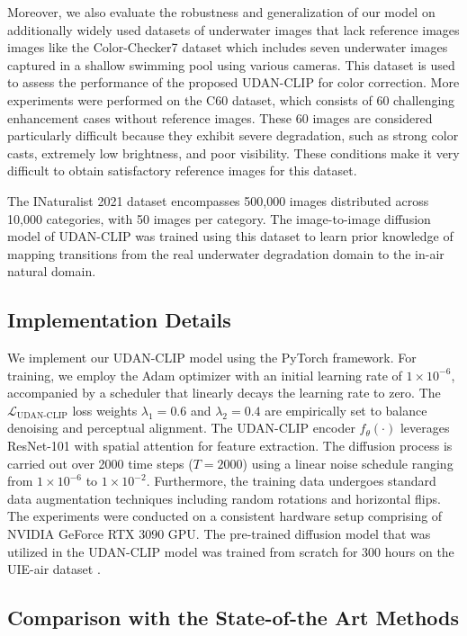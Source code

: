 \documentclass[3p,12pt,authoryear]{elsarticle}
\begin{document}
Moreover, we also evaluate the robustness and generalization of our model on additionally widely used datasets of underwater images that lack reference images images like the Color-Checker7 \cite{gsciede00note:crna03} dataset which includes seven underwater images captured in a shallow swimming pool using various cameras. This dataset is used to assess the performance of the proposed UDAN-CLIP for color correction. More experiments were performed on the C60 \cite{8917818} dataset, which consists of 60 challenging enhancement cases without reference images. These 60 images are considered particularly difficult because they exhibit severe degradation, such as strong color casts, extremely low brightness,  and poor visibility. These conditions make it very difficult to obtain satisfactory reference images for this dataset.

The INaturalist 2021 dataset encompasses 500,000 images distributed across 10,000 categories, with 50 images per category. The image-to-image diffusion model of UDAN-CLIP was trained using this dataset to learn prior knowledge of mapping transitions from the real underwater degradation domain to the in-air natural domain.


\subsection{Implementation Details}

We implement our UDAN-CLIP model using the PyTorch framework. For training, we employ the Adam optimizer with an initial learning rate of $1 \times 10^{-6}$, accompanied by a scheduler that linearly decays the learning rate to zero. The $\mathcal{L}_{\text{UDAN-CLIP}}$ loss weights $\lambda_1 = 0.6$ and $\lambda_2 = 0.4$ are empirically set to balance denoising and perceptual alignment. The UDAN-CLIP encoder $f_{\theta}(\cdot)$ leverages ResNet-101 with spatial attention for feature extraction. The diffusion process is carried out over 2000 time steps ($T = 2000$) using a linear noise schedule ranging from $1 \times 10^{-6}$ to $1 \times 10^{-2}$. Furthermore, the training data undergoes standard data augmentation techniques including random rotations and horizontal flips. The experiments were conducted on a consistent hardware setup comprising of NVIDIA GeForce RTX 3090 GPU. The pre-trained diffusion model that was utilized in the UDAN-CLIP model was trained from scratch for 300 hours on the UIE-air dataset \cite{liu2024underwaterimageenhancementdiffusion}. 


\subsection{Comparison with the State-of-the Art Methods}
\end{document}
